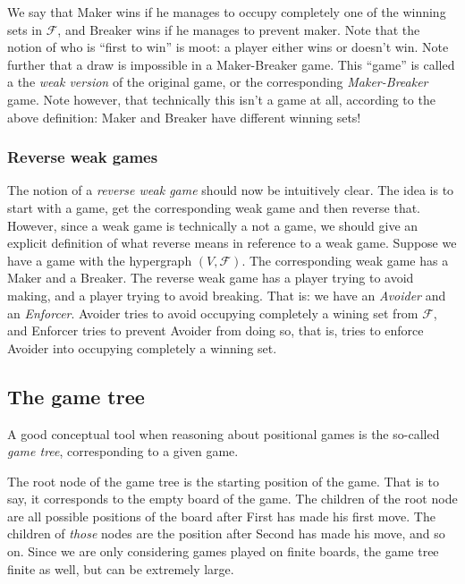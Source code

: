 We say that Maker wins if he manages to occupy completely one of the winning sets in $\mathcal F$, and Breaker wins if he manages to prevent maker.
Note that the notion of who is ``first to win'' is moot: a player either wins or doesn't win.
Note further that a draw is impossible in a Maker-Breaker game.
This ``game'' is called a the \emph{weak version} of the original game, or the corresponding \emph{Maker-Breaker} game.
Note however, that technically this isn't a game at all, according to the above definition: Maker and Breaker have different winning sets!

\subsubsection{Reverse weak games}

The notion of a \emph{reverse weak game} should now be intuitively clear.
The idea is to start with a game, get the corresponding weak game and then reverse that.
However, since a weak game is technically a not a game, we should give an explicit definition of what reverse means in reference to a weak game.
Suppose we have a game with the hypergraph $(V,\mathcal F)$.
The corresponding weak game has a Maker and a Breaker. The reverse weak game has a player trying to avoid making, and a player trying to avoid breaking. That is: we have an \emph{Avoider} and an \emph{Enforcer}.
Avoider tries to avoid occupying completely a wining set from $\mathcal F$, and Enforcer tries to prevent Avoider from doing so, that is, tries to enforce Avoider into occupying completely a winning set.


\subsection{The game tree}
\label{subsec:gametree}
A good conceptual tool when reasoning about positional games is the so-called \emph{game tree}, corresponding to a given game.

The root node of the game tree is the starting position of the game.
That is to say, it corresponds to the empty board of the game.
The children of the root node are all possible positions of the board after First has made his first move.
The children of \emph{those} nodes are the position after Second has made his move, and so on.
Since we are only considering games played on finite boards, the game tree finite as well, but can be extremely large.
